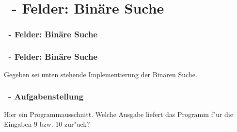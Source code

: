 \def\stitle{\theexercise\ - Felder: Binäre Suche}
\section{\stitle}
\begin{frame}
  \frametitle{\stitle}%
\tableofcontents[current]
\end{frame}


\begin{frame}[t]%
    \frametitle{\stitle}

Gegeben sei unten stehende Implementierung der Binären Suche.

\end{frame}


\begin{frame}
 \frametitle{\theexercise \, - Aufgabenstellung}%


Hier ein Programmausschnitt.
Welche Ausgabe liefert das Programm f"ur die Eingaben 9 bzw. 10 zur"uck?

\end{frame}
